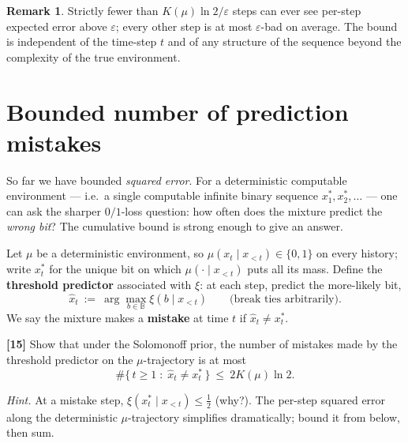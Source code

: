 \documentclass[fontsize=11pt, parskip=half]{scrartcl}
\theoremstyle{definition}
\newtheorem{remark}[theorem]{Remark}
\begin{document}
\begin{remark}
Strictly fewer than $K(\mu) \ln 2 / \varepsilon$ steps can ever see per-step
expected error above $\varepsilon$; every other step is at most $\varepsilon$-bad
on average. The bound is independent of the time-step $t$ and of any structure of
the sequence beyond the complexity of the true environment.
\end{remark}

\section{Bounded number of prediction mistakes}\label{prob:mistakes}

So far we have bounded \emph{squared error}. For a deterministic computable
environment --- i.e.\ a single computable infinite binary sequence $x_1^*, x_2^*,
\dots$ --- one can ask the sharper $0/1$-loss question: how often does the
mixture predict the \emph{wrong bit}? The cumulative bound is strong enough to
give an answer.

Let $\mu$ be a deterministic environment, so $\mu(x_t \mid x_{<t}) \in \{0,1\}$
on every history; write $x_t^*$ for the unique bit on which $\mu(\cdot \mid x_{<t})$
puts all its mass. Define the \textbf{threshold predictor} associated with $\xi$:
at each step, predict the more-likely bit,
\[
  \hat{x}_t ~:=~ \arg\max_{b \in \mathbb{B}} \xi(b \mid x_{<t})
  \qquad \text{(break ties arbitrarily).}
\]
We say the mixture makes a \textbf{mistake} at time $t$ if $\hat{x}_t \neq x_t^*$.

\bigskip

\noindent
\textbf{[15]} Show that under the Solomonoff prior, the number of mistakes
made by the threshold predictor on the $\mu$-trajectory is at most
\[
  \#\{\, t \geq 1 \;:\; \hat{x}_t \neq x_t^* \,\}
  ~\leq~ 2 K(\mu) \ln 2.
\]

\textit{Hint.} At a mistake step, $\xi(x_t^* \mid x_{<t}) \leq \tfrac12$ (why?).
The per-step squared error along the deterministic $\mu$-trajectory
simplifies dramatically; bound it from below, then sum.
\end{document}
